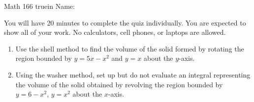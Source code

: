 \documentclass[12pt]{article}
\begin{document}
\pagestyle{empty} %

\noindent
{Math 166  truein  Name:\ \hrulefill}
\newline {} 
\noindent
\newline
\newline

 You will have 20 minutes to complete the quiz individually. You are expected to show all of your work. No calculators, cell phones, or laptops are allowed.

\medskip




\begin{enumerate}
	
\item Use the shell method to find the volume of the solid formed by rotating the region bounded by $y = 5x-x^2$ and $y = x$ about the $y$-axis.

\vspace{3in}

\item Using the washer method, set up but do not evaluate an integral representing the volume of the solid obtained by revolving the region bounded by $y =6-x^{2}$, $y=x^{2}$ about the $x$-axis.

\end{enumerate}
\end{document}
